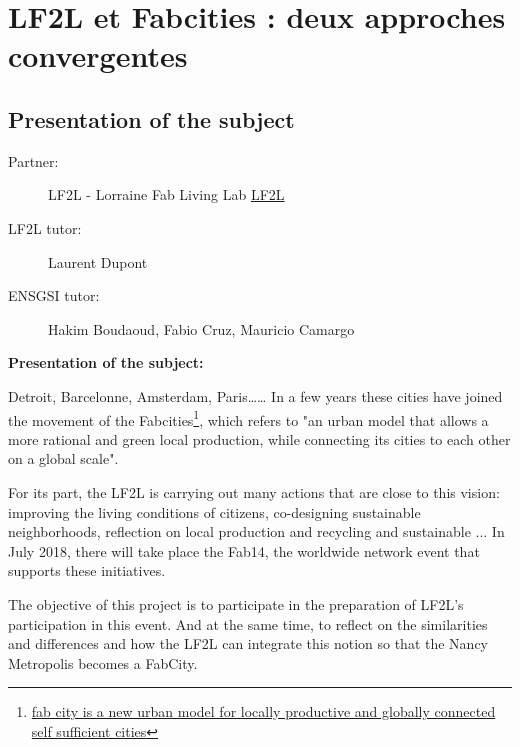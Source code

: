 

\chapter{LF2L et Fabcities : deux approches convergentes}


\section{Presentation of the subject}


\begin{tcolorbox}[
	toptitle=3mm,
	colframe=blue!25,
	colback=blue!10,
	coltitle=blue!20!black,  
	fonttitle=\bfseries,
	boxrule=1mm,
	segmentation style={line width=0.5mm, blue!25},
	adjusted title= LF2L et Fabcities : deux approches convergentes ? ]

	\begin{description}
		\item[Partner:] LF2L 	- Lorraine Fab Living Lab \href{http://www.lf2l.fr}{LF2L}			
		\item[LF2L tutor:] Laurent Dupont 
		\item[ENSGSI tutor:] Hakim Boudaoud, Fabio Cruz, Mauricio Camargo 

	\end{description}



	
\textbf{Presentation of the subject:}

Detroit, Barcelonne, Amsterdam, Paris……
In a few years these cities have joined the movement of the Fabcities\footnote{ \href{ http://fab.city }{fab city is a new urban model for locally productive and globally connected self sufficient cities}
}, which refers to "an urban model that allows a more rational and green local production, while connecting its cities to each other on a global scale".

For its part, the LF2L is carrying out many actions that are close to this vision: improving the living conditions of citizens, co-designing sustainable neighborhoods, reflection on local production and recycling and sustainable ...
In July 2018, there will take place the  Fab14, the worldwide network event that supports these initiatives.

The objective of this project is to participate in the preparation of LF2L's participation in this event. And at the same time, to reflect on the similarities and differences and how the LF2L can integrate this notion so that the Nancy Metropolis becomes a FabCity.



\end{tcolorbox}
